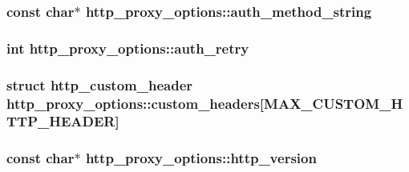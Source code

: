 \subsubsection[{auth\+\_\+method\+\_\+string}]{\setlength{\rightskip}{0pt plus 5cm}const char$\ast$ http\+\_\+proxy\+\_\+options\+::auth\+\_\+method\+\_\+string}\label{structhttp__proxy__options_aba0685c6b222bbd09f13b5a1588d0396}
\hypertarget{structhttp__proxy__options_ab231c657d09bf5f0842af2d408dc3135}{}
\subsubsection[{auth\+\_\+retry}]{\setlength{\rightskip}{0pt plus 5cm}int http\+\_\+proxy\+\_\+options\+::auth\+\_\+retry}\label{structhttp__proxy__options_ab231c657d09bf5f0842af2d408dc3135}
\hypertarget{structhttp__proxy__options_adc7c72951f926ffe5b1d8f37bc8fdf59}{}
\subsubsection[{custom\+\_\+headers}]{\setlength{\rightskip}{0pt plus 5cm}struct {\bf http\+\_\+custom\+\_\+header} http\+\_\+proxy\+\_\+options\+::custom\+\_\+headers\mbox{[}{\bf M\+A\+X\+\_\+\+C\+U\+S\+T\+O\+M\+\_\+\+H\+T\+T\+P\+\_\+\+H\+E\+A\+D\+E\+R}\mbox{]}}\label{structhttp__proxy__options_adc7c72951f926ffe5b1d8f37bc8fdf59}
\hypertarget{structhttp__proxy__options_a4e0ccf96b14cb5f21944224586b640b0}{}
\subsubsection[{http\+\_\+version}]{\setlength{\rightskip}{0pt plus 5cm}const char$\ast$ http\+\_\+proxy\+\_\+options\+::http\+\_\+version}\label{structhttp__proxy__options_a4e0ccf96b14cb5f21944224586b640b0}
\hypertarget{structhttp__proxy__options_a9f69ad3374ce517f81591ba8a2094921}{}
